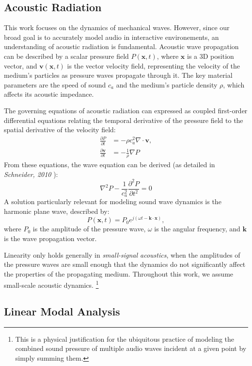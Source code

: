 \documentclass[12pt]{article}
\newcommand{\vct}[1]{\mathbf{#1}}
\begin{document}
\subsection{Acoustic Radiation}

This work focuses on the dynamics of mechanical waves.
However, since our broad goal is to accurately model audio in interactive environements, an understanding of acoustic radiation is fundamental.
Acoustic wave propagation can be described by a scalar pressure field $P(\vct{x}, t)$, where $\vct{x}$ is a 3D position vector, and $\mathbf{v}(\vct{x}, t)$ is the vector velocity field, representing the velocity of the medium's particles as pressure waves propagate through it.
The key material parameters are the speed of sound $c_a$ and the medium's particle density $\rho$, which affects its acoustic impedance.

The governing equations of acoustic radiation can expressed as coupled first-order differential equations relating the temporal derivative of the pressure field to the spatial derivative of the velocity field:
\begin{align*}
\frac{\partial P}{\partial t} &= -\rho c_a^2 \nabla \cdot \mathbf{v},\\
\frac{\partial \mathbf{v}}{\partial t} &= -\frac{1}{\rho}\nabla P
\end{align*}
From these equations, the wave equation can be derived (as detailed in \textit{Schneider, 2010} \cite{schneider_fdtd_2010}):
$$\nabla^2P - \frac{1}{c_a^2}\frac{\partial^2 P}{\partial t^2} = 0$$
A solution particularly relevant for modeling sound wave dynamics is the harmonic plane wave, described by:
$$P(\vct{x},t) = P_0 e^{j(\omega t - \vct{k} \cdot \vct{x})},$$
where $P_0$ is the amplitude of the pressure wave, $\omega$ is the angular frequency, and $\vct{k}$ is the wave propagation vector.

Linearity only holds generally in \textit{small-signal acoustics}, when the amplitudes of the pressure waves are small enough that the dynamics do not significantly affect the properties of the propagating medium.
Throughout this work, we assume small-scale acoustic dynamics.
\footnote{This is a physical justification for the ubiquitous practice of modeling the combined sound pressure of multiple audio waves incident at a given point by simply summing them.}

\subsection{Linear Modal Analysis}
\end{document}
